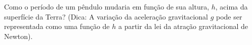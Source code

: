 Como o período de um pêndulo mudaria em função de sua altura, $h$, acima da superfície da Terra? (Dica: A variação da aceleração gravitacional $g$ pode ser representada como uma função de $h$ a partir da lei da atração gravitacional de Newton).

